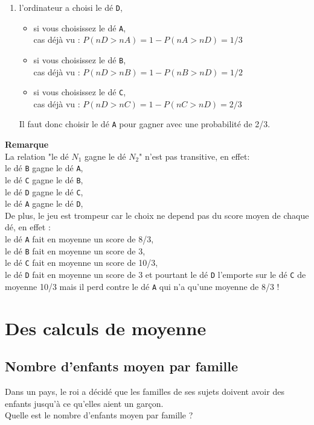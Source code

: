 \documentclass[a4paper,11pt]{book}
\begin{document}
\begin{enumerate}
\begin{itemize}
cas d\'ej\`a vu :
$ P(nC>nA)=1-P(nA>nC)=5/9$
\end{itemize}
Il faut donc choisir le d\'e {\tt D} pour gagner avec une probabilit\'e de 2/3.
\item l'ordinateur a choisi le d\'e {\tt D},
\begin{itemize}
\item si vous choisissez le d\'e {\tt A},\\
cas d\'ej\`a vu : $P(nD>nA)=1-P(nA>nD)=1/3$ 
\item si vous choisissez le d\'e {\tt B},\\
cas d\'ej\`a vu : $P(nD>nB)=1-P(nB>nD)=1/2$
\item si vous choisissez le d\'e {\tt C},\\
cas d\'ej\`a vu : $P(nD>nC)=1-P(nC>nD)=2/3$
\end{itemize}
Il faut donc choisir le d\'e {\tt A} pour gagner avec une probabilit\'e de 2/3.
\end{enumerate}
{\bf Remarque}\\
La relation "le d\'e $N_1$ gagne le d\'e $N_2$" n'est pas transitive, 
en effet:\\
le d\'e {\tt B} gagne le d\'e {\tt A},\\
le d\'e {\tt C} gagne le d\'e {\tt B},\\
le d\'e {\tt D} gagne le d\'e {\tt C},\\
le d\'e {\tt A} gagne le d\'e {\tt D},\\
De plus, le jeu est trompeur car le choix ne depend pas du score moyen de 
chaque d\'e, en effet :\\ 
le d\'e {\tt A} fait en moyenne un score de 8/3,\\
le d\'e {\tt B} fait en moyenne un score de 3,\\
le d\'e {\tt C} fait en moyenne un score de 10/3,\\
le d\'e {\tt D} fait en moyenne un score de 3 et pourtant le d\'e {\tt D}
l'emporte sur le d\'e {\tt C} de moyenne 10/3 mais il perd contre le d\'e 
{\tt A} qui n'a qu'une moyenne de 8/3 !


\section{Des calculs de moyenne}
\subsection{Nombre d'enfants moyen par famille}
Dans un pays, le roi a d\'ecid\'e que les familles de ses sujets doivent avoir
des enfants jusqu'\`a ce qu'elles aient un gar\c{c}on.\\
Quelle est le nombre d'enfants moyen par famille ?
\end{document}
